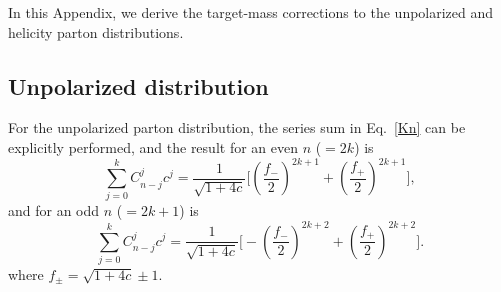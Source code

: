 
In this Appendix, we derive the target-mass corrections to the unpolarized and helicity parton distributions. 

\subsection{Unpolarized distribution}

For the unpolarized parton distribution, the series sum in Eq.~\ref{Kn} can be explicitly performed, and the result for an even $n$ ($=2k$) is
%
\begin{equation}\label{evensum}
\sum_{j=0}^k  C_{n-j}^j c^j =\frac{1}{\sqrt{1+4c}}\Big[\left(\frac{f_-}{2}\right)^{2k+1}+\left(\frac{f_+}{2}\right)^{2k+1}\Big],
\end{equation}
%
and for an odd $n$ ($=2k+1$) is
%
\begin{equation}\label{oddsum}
\sum_{j=0}^k C_{n-j}^j c^j =\frac{1}{\sqrt{1+4c}}\Big[-\left(\frac{f_-}{2}\right)^{2k+2}+\left(\frac{f_+}{2}\right)^{2k+2}\Big].
\end{equation}
%
where $f_{\pm}=\sqrt{1+4c}\pm 1$. 

